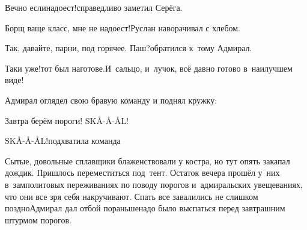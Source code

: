 \diagdash Вечно если\mdash надоест!\mdash справедливо заметил Серёга.

\diagdash Борщ ваще класс, мне не надоест!\mdash Руслан наворачивал с хлебом.

%	
%	
%	
%	
%	



\diagdash Так, давайте, парни, под горячее. Паш?\mdash обратился к~тому Адмирал.

\diagdash Таки уже!\mdash тот был наготове.\mdash И~сальцо, и~лучок, всё давно готово в~наилучшем виде!

%
%
%
%


Адмирал оглядел свою бравую команду и поднял кружку:

\diagdash Завтра берём пороги! SKÅ-Å-ÅL!

\diagdash SKÅ-Å-ÅL!\mdash подхватила команда\myldots{}

\myldots{}Сытые, довольные сплавщики блаженствовали у костра, но тут опять закапал дождик. Пришлось переместиться под~тент.
Остаток вечера прошёл у~них в~замполитовых переживаниях по поводу порогов и~адмиральских увещеваниях, что они все зря себя накручивают.
Спать все завалились не слишком поздно\mdash Адмирал дал отбой пораньше\mdash надо было выспаться перед завтрашним штурмом порогов.

\begin{center}
\end{center}
